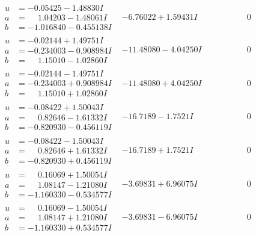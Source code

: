 \documentclass[1p]{elsarticle_modified}
\theoremstyle{definition}
\begin{document}
$$\begin{array}{c|c|c}
\begin{aligned}
u &= -0.05425 - 1.48830 I \\
a &= \phantom{-}1.04203 - 1.48061 I \\
b &= -1.016840 - 0.455138 I\end{aligned}
 & -6.76022 + 1.59431 I & \phantom{-0.000000 } 0 \\ \hline\begin{aligned}
u &= -0.02144 + 1.49751 I \\
a &= -0.234003 - 0.908984 I \\
b &= \phantom{-}1.15010 - 1.02860 I\end{aligned}
 & -11.48080 - 4.04250 I & \phantom{-0.000000 } 0 \\ \hline\begin{aligned}
u &= -0.02144 - 1.49751 I \\
a &= -0.234003 + 0.908984 I \\
b &= \phantom{-}1.15010 + 1.02860 I\end{aligned}
 & -11.48080 + 4.04250 I & \phantom{-0.000000 } 0 \\ \hline\begin{aligned}
u &= -0.08422 + 1.50043 I \\
a &= \phantom{-}0.82646 - 1.61332 I \\
b &= -0.820930 - 0.456119 I\end{aligned}
 & -16.7189 - 1.7521 I & \phantom{-0.000000 } 0 \\ \hline\begin{aligned}
u &= -0.08422 - 1.50043 I \\
a &= \phantom{-}0.82646 + 1.61332 I \\
b &= -0.820930 + 0.456119 I\end{aligned}
 & -16.7189 + 1.7521 I & \phantom{-0.000000 } 0 \\ \hline\begin{aligned}
u &= \phantom{-}0.16069 + 1.50054 I \\
a &= \phantom{-}1.08147 - 1.21080 I \\
b &= -1.160330 - 0.534577 I\end{aligned}
 & -3.69831 + 6.96075 I & \phantom{-0.000000 } 0 \\ \hline\begin{aligned}
u &= \phantom{-}0.16069 - 1.50054 I \\
a &= \phantom{-}1.08147 + 1.21080 I \\
b &= -1.160330 + 0.534577 I\end{aligned}
 & -3.69831 - 6.96075 I & \phantom{-0.000000 } 0\\

\end{array}$$
\end{document}
